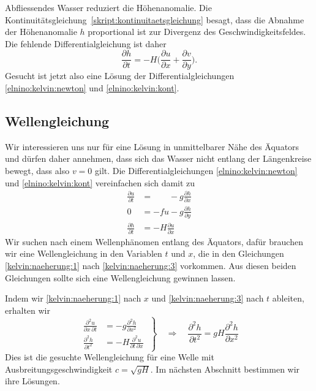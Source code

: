 Abfliessendes Wasser reduziert die Höhenanomalie.
Die Kontinuitätsgleichung~\eqref{skript:kontinuitaetsgleichung}
besagt, dass die Abnahme der Höhenanomalie $h$ proportional ist zur
Divergenz des Geschwindigkeitsfeldes.
Die fehlende Differentialgleichung ist daher
\begin{equation}
\frac{\partial h}{\partial t}
=
-H\biggl(
\frac{\partial u}{\partial x} + \frac{\partial v}{\partial y}
\biggr).
\label{elnino:kelvin:kont}
\end{equation}
Gesucht ist jetzt also eine Lösung der Differentialgleichungen
\eqref{elnino:kelvin:newton} und \eqref{elnino:kelvin:kont}.

\subsection{Wellengleichung}
Wir interessieren uns nur für eine Lösung in unmittelbarer Nähe des
Äquators und dürfen daher annehmen, dass sich das Wasser nicht
entlang der Längenkreise bewegt, dass also $v=0$ gilt.
Die Differentialgleichungen
\eqref{elnino:kelvin:newton} und \eqref{elnino:kelvin:kont}
vereinfachen sich damit zu
\begin{align}
\frac{\partial u}{\partial t}
&=
\phantom{-fu}
 - g\frac{\partial h}{\partial x}
\label{kelvin:naeherung:1}
\\
0
&=
-fu - g\frac{\partial h}{\partial y}
\label{kelvin:naeherung:2}
\\
\frac{\partial h}{\partial t}
&=
-H
\frac{\partial u}{\partial x}
\label{kelvin:naeherung:3}
\end{align}
Wir suchen nach einem Wellenphänomen entlang des Äquators, dafür
brauchen wir eine Wellengleichung in den Variablen $t$ und $x$,
die in den Gleichungen \eqref{kelvin:naeherung:1} nach
\eqref{kelvin:naeherung:3} vorkommen.
Aus diesen beiden Gleichungen sollte sich eine Wellengleichung
gewinnen lassen.

Indem wir \eqref{kelvin:naeherung:1} nach $x$ und 
\eqref{kelvin:naeherung:3} nach $t$ ableiten, erhalten wir
\begin{equation}
\left.
\begin{aligned}
\frac{\partial^2 u}{\partial x\,\partial t}
&=
-g\frac{\partial^2h}{\partial x^2}
\\
\frac{\partial^2 h}{\partial t^2}
&=
-H\frac{\partial^2 u}{\partial t\,\partial x}
\end{aligned}
\;
\right\}
\quad
\Rightarrow
\quad
\frac{\partial^2 h}{\partial t^2}
=
gH\frac{\partial^2 h}{\partial x^2}
\label{kelvin:wellengleichung}
\end{equation}
Dies ist die gesuchte Wellengleichung für eine Welle mit
Ausbreitungsgeschwindigkeit $c=\sqrt{gH}$.
Im nächsten Abschnitt bestimmen wir ihre Lösungen.

